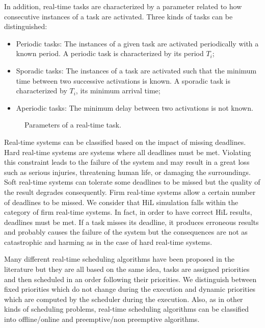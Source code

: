 In addition, real-time tasks are characterized by a parameter related to how consecutive instances of a task are activated. Three kinds of tasks can be distinguished:
\begin{itemize}
\item Periodic tasks: The instances of a given task are activated periodically with a known period. A periodic task is characterized by its period $T_i$;
\item Sporadic tasks: The instances of a task are activated such that the minimum time between two successive activations is known. A sporadic task is characterized by $T_i$, its minimum arrival time;
\item Aperiodic tasks: The minimum delay between two activations is not known.
\end{itemize} 

\begin{figure}[phbt]
\centering

\caption{Parameters of a real-time task.}
\label{fig:taskmodel}
\end{figure} 

Real-time systems can be classified based on the impact of missing deadlines. Hard real-time systems are systems where all deadlines must be met. Violating this constraint leads to the failure of the system and may result in a great loss such as serious injuries, threatening human life, or damaging the surroundings. Soft real-time systems can tolerate some deadlines to be missed but the quality of the result degrades consequently. Firm real-time systems allow a certain number of deadlines to be missed. We consider that HiL simulation falls within the category of firm real-time systems. In fact, in order to have correct HiL results, deadlines must be met. If a task misses its deadline, it produces erroneous results and probably causes the failure of the system but the consequences are not as catastrophic and harming as in the case of hard real-time systems.   

Many different real-time scheduling algorithms have been proposed in the literature but they are all based on the same idea, tasks are assigned priorities and then scheduled in an order following their priorities. We distinguish between fixed priorities which do not change during the execution and dynamic priorities which are computed by the scheduler during the execution. Also, as in other kinds of scheduling problems, real-time scheduling algorithms can be classified into offline/online and preemptive/non preemptive algorithms.

